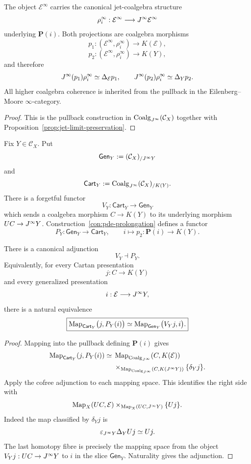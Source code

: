 \begin{theorem}
\label{thm:prolongation-coalgebra}
The object $\mathcal E^\infty$ carries the canonical jet-coalgebra structure
\[
    \rho_i^\infty:\mathcal E^\infty\longrightarrow J^{\infty}\mathcal E^\infty
\]
underlying $\mathbf P(i)$.  Both projections are coalgebra morphisms
\[
    p_1:(\mathcal E^\infty,\rho_i^\infty)\to K(\mathcal E),
\]
\[
    p_2:(\mathcal E^\infty,\rho_i^\infty)\to K(Y),
\]
and therefore
\[
    J^{\infty}(p_1)\rho_i^\infty\simeq\Delta_{\mathcal E}p_1,
    \qquad
    J^{\infty}(p_2)\rho_i^\infty\simeq\Delta_Yp_2.
\]
All higher coalgebra coherence is inherited from the pullback in the Eilenberg--Moore $\infty$-category.
\end{theorem}

\begin{proof}
This is the pullback construction in $\operatorname{Coalg}_{J^{\infty}}(\mathcal C_X)$ together with Proposition~\ref{prop:jet-limit-preservation}.
\end{proof}

\begin{construction}
\label{con:presentation-categories}
Fix $Y\in\mathcal C_X$.  Put
\[
    \mathsf{Gen}_Y:=(\mathcal C_X)_{/J^{\infty} Y}
\]
and
\[
    \mathsf{Cart}_Y:=
    \operatorname{Coalg}_{J^{\infty}}(\mathcal C_X)_{/K(Y)}.
\]
There is a forgetful functor
\[
    V_Y:\mathsf{Cart}_Y\longrightarrow\mathsf{Gen}_Y
\]
which sends a coalgebra morphism $C\to K(Y)$ to its underlying morphism $UC\to J^{\infty} Y$.  Construction~\ref{con:pde-prolongation} defines a functor
\[
    P_Y:\mathsf{Gen}_Y\longrightarrow\mathsf{Cart}_Y,
    \qquad
    i\longmapsto p_2:\mathbf P(i)\to K(Y).
\]
\end{construction}

\begin{theorem}
\label{thm:cartan-prolongation-adjunction}
There is a canonical adjunction
\[
    \boxed{V_Y\dashv P_Y.}
\]
Equivalently, for every Cartan presentation
\[
    j:C\longrightarrow K(Y)
\]
and every generalized presentation
\[
    i:\mathcal E\longrightarrow J^{\infty} Y,
\]
there is a natural equivalence
\[
\boxed{
    \operatorname{Map}_{\mathsf{Cart}_Y}\bigl(j,P_Y(i)\bigr)
    \simeq
    \operatorname{Map}_{\mathsf{Gen}_Y}\bigl(V_Yj,i\bigr).
}
\]
\end{theorem}

\begin{proof}
Mapping into the pullback defining $\mathbf P(i)$ gives
\[
\begin{aligned}
\operatorname{Map}_{\mathsf{Cart}_Y}(j,P_Y(i))
\simeq{}
&\operatorname{Map}_{\operatorname{Coalg}_{J^{\infty}}}(C,K(\mathcal E))\\
&\times_{\operatorname{Map}_{\operatorname{Coalg}_{J^{\infty}}}(C,K(J^{\infty} Y))}
\{\delta_Yj\}.
\end{aligned}
\]
Apply the cofree adjunction to each mapping space.  This identifies the right side with
\[
    \operatorname{Map}_X(UC,\mathcal E)
    \times_{\operatorname{Map}_X(UC,J^{\infty} Y)}
    \{Uj\}.
\]
Indeed the map classified by $\delta_Yj$ is
\[
    \varepsilon_{J^{\infty} Y}\Delta_YUj\simeq Uj.
\]
The last homotopy fibre is precisely the mapping space from the object $V_Yj:UC\to J^{\infty} Y$ to $i$ in the slice $\mathsf{Gen}_Y$.  Naturality gives the adjunction.
\end{proof}

